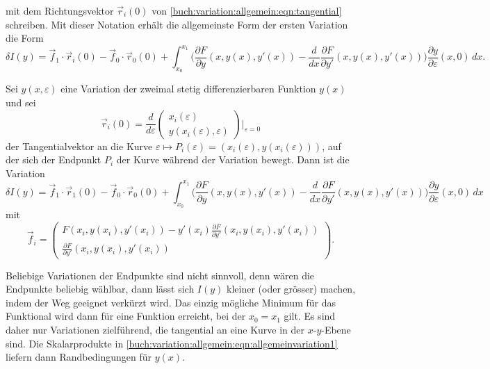 mit dem Richtungsvektor  $\vec{r}_i(0)$ von
\eqref{buch:variation:allgemein:eqn:tangential} schreiben.
Mit dieser Notation erhält die allgemeinste Form der ersten Variation
die Form
\begin{equation}
\delta I(y)
=
\vec{f}_1\cdot \vec{r}_i(0)
-
\vec{f}_0\cdot \vec{r}_0(0)
+
\int_{x_0}^{x_1}
\biggl(
\frac{\partial F}{\partial y}(x,y(x),y'(x))
-
\frac{d}{dx}\frac{\partial F}{\partial y'}(x,y(x),y'(x))
\biggr)
\frac{\partial y}{\partial \varepsilon}(x,0)
\,dx.
\end{equation}

\begin{satz}
\label{buch:variation:allgemein:satz:allgemeinvariation1}
Sei $y(x,\varepsilon)$ eine Variation der zweimal stetig differenzierbaren
Funktion $y(x)$ und sei
\[
\vec{r}_i(0)
=
\frac{d}{d\varepsilon}
\begin{pmatrix}
x_i(\varepsilon)\\
y(x_i(\varepsilon),\varepsilon)
\end{pmatrix}\bigg|_{\varepsilon=0}
\]
der Tangentialvektor an die Kurve
$\varepsilon\mapsto P_i(\varepsilon) = (x_i(\varepsilon),y(x_i(\varepsilon)))$,
auf der sich der Endpunkt $P_i$ der Kurve während der Variation
bewegt.
Dann ist die Variation
\begin{equation}
\delta I(y)
=
\vec{f}_1\cdot\vec{r}_1(0)
-
\vec{f}_0\cdot\vec{r}_0(0)
+
\int_{x_0}^{x_1}
\biggl(
\frac{\partial F}{\partial y}(x,y(x),y'(x))
-
\frac{d}{dx}\frac{\partial F}{\partial y'}(x,y(x),y'(x))
\biggr)
\frac{\partial y}{\partial \varepsilon}(x,0)
\,dx
\label{buch:variation:allgemein:eqn:allgemeinvariation1}
\end{equation}
mit
\begin{equation}
\vec{f}_i
=
\begin{pmatrix}
\displaystyle
F(x_i,y(x_i),y'(x_i))
-
y'(x_i)
\frac{\partial F}{\partial y'}(x_i,y(x_i),y'(x_i))
\\[3pt]
\displaystyle
\frac{\partial F}{\partial y'}(x_i,y(x_i),y'(x_i))
\end{pmatrix}.
\label{buch:nebenbedingungen:allgemein:eqn:fi}
\end{equation}
\end{satz}

Beliebige Variationen der Endpunkte sind nicht sinnvoll, denn
wären die Endpunkte beliebig wählbar, dann lässt sich $I(y)$ kleiner
(oder grösser) machen, indem der Weg geeignet verkürzt wird.
Das einzig mögliche Minimum für das Funktional wird dann für eine
Funktion erreicht, bei der $x_0=x_1$ gilt.
Es sind daher nur Variationen zielführend, die tangential an eine
Kurve in der $x$-$y$-Ebene sind.
Die Skalarprodukte in 
\eqref{buch:variation:allgemein:eqn:allgemeinvariation1}
liefern dann Randbedingungen für $y(x)$.

